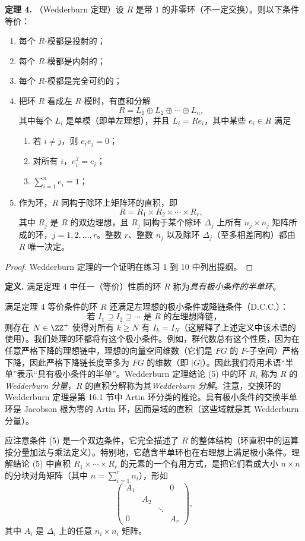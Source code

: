 \medskip
\noindent\textbf{定理 4.} （Wedderburn 定理）设 $R$ 是带 $1$ 的非零环（不一定交换）。则以下条件等价：
\begin{enumerate}[label=(\arabic*)]
  \item 每个 $R$-模都是投射的；
  \item 每个 $R$-模都是内射的；
  \item 每个 $R$-模都是完全可约的；
  \item 把环 $R$ 看成左 $R$-模时，有直和分解
  \[
    R=L_1\oplus L_2\oplus\cdots\oplus L_n,
  \]
  其中每个 $L_i$ 是单模（即单左理想），并且 $L_i=Re_i$，其中某些 $e_i\in R$ 满足
  \begin{enumerate}[label=(\roman*)]
    \item 若 $i\neq j$，则 $e_i e_j=0$；
    \item 对所有 $i$，$e_i^2=e_i$；
    \item $\sum_{i=1}^n e_i=1$；
  \end{enumerate}
  \item 作为环，$R$ 同构于除环上矩阵环的直积，即
  \[
    R=R_1\times R_2\times\cdots\times R_r,
  \]
  其中 $R_j$ 是 $R$ 的双边理想，且 $R_j$ 同构于某个除环 $\Delta_j$ 上所有 $n_j\times n_j$ 矩阵所成的环，$j=1,2,
  \ldots,r$。整数 $r$、整数 $n_j$ 以及除环 $\Delta_j$（至多相差同构）都由 $R$ 唯一决定。
\end{enumerate}

\begin{proof}
Wedderburn 定理的一个证明在练习 1 到 10 中列出提纲。
\end{proof}

\noindent\textbf{定义.} 满足定理 4 中任一（等价）性质的环 $R$ 称为\emph{具有极小条件的半单环}。

满足定理 4 等价条件的环 $R$ 还满足左理想的极小条件或降链条件（D.C.C.）：
\[
  \text{若 } I_1\supseteq I_2\supseteq\cdots
  \text{ 是 }R\text{ 的左理想降链，}
\]
则存在 $N\in\ZZ^+$ 使得对所有 $k\geq N$ 有 $I_k=I_N$（这解释了上述定义中该术语的使用）。我们处理的环都将有这个极小条件。例如，群代数总有这个性质，因为在任意严格下降的理想链中，理想的向量空间维数（它们是 $FG$ 的 $F$-子空间）严格下降，因此严格下降链长度至多为 $FG$ 的维数（即 $|G|$）。因此我们将用术语“半单”表示“具有极小条件的半单”。Wedderburn 定理结论 (5) 中的环 $R_i$ 称为 $R$ 的\emph{Wedderburn 分量}，$R$ 的直积分解称为其\emph{Wedderburn 分解}。注意，交换环的 Wedderburn 定理是第 16.1 节中 Artin 环分类的推论。具有极小条件的交换半单环是 Jacobson 根为零的 Artin 环，因而是域的直积（这些域就是其 Wedderburn 分量）。

应注意条件 (5) 是一个双边条件，它完全描述了 $R$ 的整体结构（环直积中的运算按分量加法与乘法定义）。特别地，它蕴含半单环也在右理想上满足极小条件。理解结论 (5) 中直积 $R_1\times\cdots\times R_r$ 的元素的一个有用方式，是把它们看成大小 $n\times n$ 的分块对角矩阵（其中 $n=\sum_{i=1}^r n_i$），形如
\[
  \begin{pmatrix}
  A_1&&&0\\
  &A_2&&\\
  &&\ddots&\\
  0&&&A_r
  \end{pmatrix},
\]
其中 $A_i$ 是 $\Delta_i$ 上的任意 $n_i\times n_i$ 矩阵。

